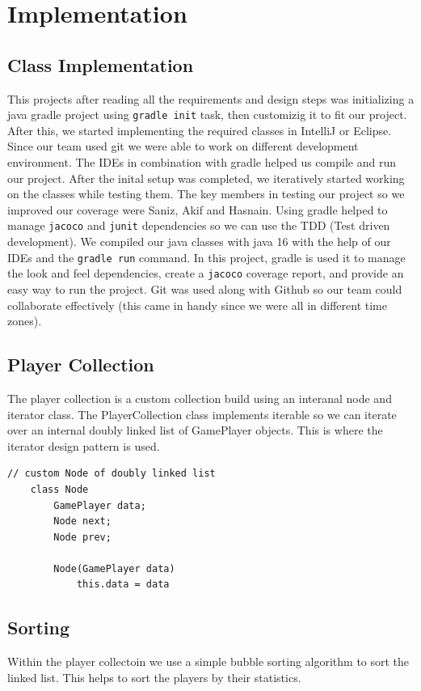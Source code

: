 \documentclass[12pt, dvipsnames, a4paper]{article}
\newcommand{\code}[1]{\texttt{#1}}
\begin{document}
\section{Implementation}
\subsection{Class Implementation}
This projects after reading all the requirements and design steps was initializing a java
gradle project using \code{gradle init} task, then customizig it to fit our project. After this, we started implementing
the required classes in IntelliJ or Eclipse. Since our team used git we were able to work on different development environment.
The IDEs in combination with gradle helped us compile and run our project. After the inital setup was completed, we iteratively
started working on the classes while testing them. The key members in testing our project so we improved our
coverage were Saniz, Akif and Hasnain. Using gradle helped to manage \code{jacoco} and \code{junit} dependencies so we can use
the TDD (Test driven development). We compiled our java classes with java 16 with the help of our IDEs and the \code{gradle run} command.
In this project, gradle is used it to manage the look and feel dependencies, create a \code{jacoco} coverage report, and provide an easy
way to run the project. Git was used along with Github so our team could collaborate effectively (this came in handy since we were all in different
time zones).

\subsection{Player Collection}
The player collection is a custom collection build using an interanal node and iterator class. The PlayerCollection class
implements iterable so we can iterate over an internal doubly linked list of GamePlayer objects.
This is where the iterator design pattern is used.

\begin{lstlisting}[frame=single, basicstyle=\small]
	// custom Node of doubly linked list
	class Node
        GamePlayer data;
        Node next;
        Node prev;

        Node(GamePlayer data)
            this.data = data
\end{lstlisting}

\subsection{Sorting}
Within the player collectoin we use a simple bubble sorting algorithm to sort the linked list.
This helps to sort the players by their statistics.
\end{document}
